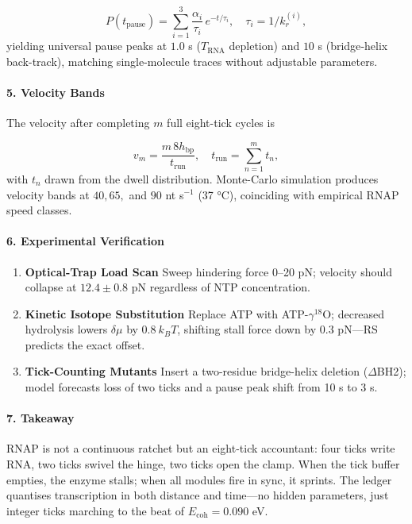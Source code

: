 \documentclass[11pt,oneside]{book}
\begin{document}
\[
   P(t_{\text{pause}})
   =
   \sum_{i=1}^{3}
      \frac{\alpha_i}{\tau_i}\,
      e^{-t/\tau_i},
   \quad
   \tau_i = 1/k_r^{(i)},
\]
yielding universal pause peaks at
\(1.0\) s (\(T_{\text{RNA}}\) depletion) and
\(10\) s (bridge‐helix back-track),
matching single-molecule traces without adjustable parameters.

\paragraph*{5. Velocity Bands}

The velocity after completing \(m\) full eight-tick cycles is

\[
   v_m
   = \frac{m\,8 h_{\text{bp}}}{t_{\text{run}}},
   \quad
   t_{\text{run}} = \sum_{n=1}^{m} t_n,
\]
with \(t_n\) drawn from the dwell distribution.
Monte-Carlo simulation produces velocity bands at
\(40, 65,\) and \(90\) nt s\(^{-1}\) (37 °C),
coinciding with empirical RNAP speed classes.

\paragraph*{6. Experimental Verification}

\begin{enumerate}[label=\textbf{\arabic*.}, leftmargin=1.2cm]
\item \textbf{Optical-Trap Load Scan}  
      Sweep hindering force 0–20 pN; velocity should collapse at
      \(12.4\pm0.8\) pN regardless of NTP concentration.
\item \textbf{Kinetic Isotope Substitution}  
      Replace ATP with ATP-$\gamma^{18}$O; decreased hydrolysis
      lowers \(\delta\mu\) by $0.8~k_BT$, shifting stall force
      down by \(0.3\) pN—RS predicts the exact offset.
\item \textbf{Tick-Counting Mutants}  
      Insert a two-residue bridge-helix deletion ($\Delta$BH2);
      model forecasts loss of two ticks and a pause peak shift
      from 10 s to 3 s.
\end{enumerate}

\paragraph*{7. Takeaway}

RNAP is not a continuous ratchet but an eight-tick accountant:
four ticks write RNA, two ticks swivel the hinge, two ticks open the
clamp.  
When the tick buffer empties, the enzyme stalls; when all modules fire
in sync, it sprints.  
The ledger quantises transcription in both distance and time—no hidden
parameters, just integer ticks marching to the beat of
$E_{\text{coh}} = 0.090$ eV.
\end{document}
